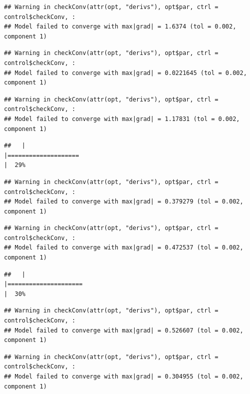 \documentclass[
  12pt,
]{book}
\begin{document}
\begin{verbatim}
## Warning in checkConv(attr(opt, "derivs"), opt$par, ctrl = control$checkConv, :
## Model failed to converge with max|grad| = 1.6374 (tol = 0.002, component 1)
\end{verbatim}

\begin{verbatim}
## Warning in checkConv(attr(opt, "derivs"), opt$par, ctrl = control$checkConv, :
## Model failed to converge with max|grad| = 0.0221645 (tol = 0.002, component 1)
\end{verbatim}

\begin{verbatim}
## Warning in checkConv(attr(opt, "derivs"), opt$par, ctrl = control$checkConv, :
## Model failed to converge with max|grad| = 1.17831 (tol = 0.002, component 1)
\end{verbatim}

\begin{verbatim}
##   |                                                                              |====================                                                  |  29%
\end{verbatim}

\begin{verbatim}
## Warning in checkConv(attr(opt, "derivs"), opt$par, ctrl = control$checkConv, :
## Model failed to converge with max|grad| = 0.379279 (tol = 0.002, component 1)
\end{verbatim}

\begin{verbatim}
## Warning in checkConv(attr(opt, "derivs"), opt$par, ctrl = control$checkConv, :
## Model failed to converge with max|grad| = 0.472537 (tol = 0.002, component 1)
\end{verbatim}

\begin{verbatim}
##   |                                                                              |=====================                                                 |  30%
\end{verbatim}

\begin{verbatim}
## Warning in checkConv(attr(opt, "derivs"), opt$par, ctrl = control$checkConv, :
## Model failed to converge with max|grad| = 0.526607 (tol = 0.002, component 1)
\end{verbatim}

\begin{verbatim}
## Warning in checkConv(attr(opt, "derivs"), opt$par, ctrl = control$checkConv, :
## Model failed to converge with max|grad| = 0.304955 (tol = 0.002, component 1)
\end{verbatim}
\end{document}
